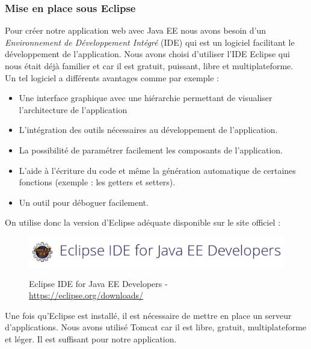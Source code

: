 \subsubsection{Mise en place sous Eclipse}
Pour créer notre application web avec Java EE nous avons besoin d'un \textit{Environnement de Développement Intégré} (IDE) qui est un logiciel facilitant le développement de l'application. Nous avons choisi d'utiliser l'IDE Eclipse qui nous était déjà familier et car il est gratuit, puissant, libre et multiplateforme.\\
Un tel logiciel a différents avantages comme par exemple :
\begin{itemize}
 \item Une interface graphique avec une hiérarchie permettant de visualiser l'architecture de l'application
 \item L'intégration des outils nécessaires au développement de l'application.
 \item La possibilité de paramétrer facilement les composants de l'application.
 \item L'aide à l'écriture du code et même la génération automatique de certaines fonctions (exemple : les getters et setters).
 \item Un outil pour déboguer facilement.
\end{itemize}

On utilise donc la version d'Eclipse adéquate disponible sur le site officiel :
\begin{figure}[H]
  \center
  \includegraphics[scale=0.5]{../graph/eclipse.png} \\
  \caption{Eclipse IDE for Java EE Developers - \url{https://eclipse.org/downloads/}}
\end{figure}

Une fois qu'Eclipse est installé, il est nécessaire de mettre en place un serveur d'applications. Nous avons utilisé Tomcat car il est libre, gratuit, multiplateforme et léger. Il est suffisant pour notre application.

